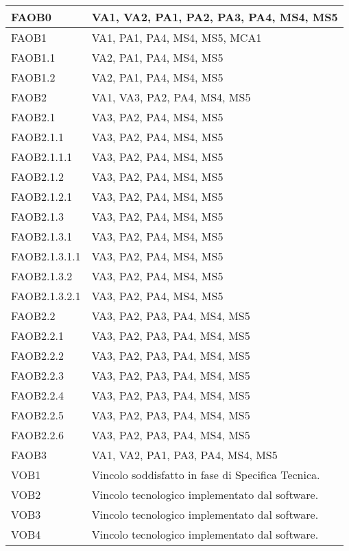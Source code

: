 {{\begin{longtable}{p{} p{}}
\midrule
FAOB0		& 	{VA1, VA2, PA1, PA2, PA3, PA4, MS4, MS5}\\
\midrule
FAOB1		& 	{VA1, PA1, PA4, MS4, MS5, MCA1}\\
\midrule
FAOB1.1		& 	{VA2, PA1, PA4, MS4, MS5}\\
\midrule
FAOB1.2		& 	{VA2, PA1, PA4, MS4, MS5}\\
\midrule
FAOB2		& 	{VA1, VA3, PA2, PA4, MS4, MS5}\\
\midrule
FAOB2.1		& 	{VA3, PA2, PA4, MS4, MS5}\\
\midrule
FAOB2.1.1		& 	{VA3, PA2, PA4, MS4, MS5}\\
\midrule
FAOB2.1.1.1		& 	{VA3, PA2, PA4, MS4, MS5}\\
\midrule
FAOB2.1.2		& 	{VA3, PA2, PA4, MS4, MS5}\\
\midrule
FAOB2.1.2.1		& 	{VA3, PA2, PA4, MS4, MS5}\\
\midrule
FAOB2.1.3		& 	{VA3, PA2, PA4, MS4, MS5}\\
\midrule
FAOB2.1.3.1		& 	{VA3, PA2, PA4, MS4, MS5}\\
\midrule
FAOB2.1.3.1.1		& 	{VA3, PA2, PA4, MS4, MS5}\\
\midrule
FAOB2.1.3.2		& 	{VA3, PA2, PA4, MS4, MS5}\\
\midrule
FAOB2.1.3.2.1		& 	{VA3, PA2, PA4, MS4, MS5}\\
\midrule
FAOB2.2		& 	{VA3, PA2, PA3, PA4, MS4, MS5}\\
\midrule
FAOB2.2.1		& 	{VA3, PA2, PA3, PA4, MS4, MS5}\\
\midrule
FAOB2.2.2		& 	{VA3, PA2, PA3, PA4, MS4, MS5}\\
\midrule
FAOB2.2.3		& 	{VA3, PA2, PA3, PA4, MS4, MS5}\\
\midrule
FAOB2.2.4		& 	{VA3, PA2, PA3, PA4, MS4, MS5}\\
\midrule
FAOB2.2.5		& 	{VA3, PA2, PA3, PA4, MS4, MS5}\\
\midrule
FAOB2.2.6		& 	{VA3, PA2, PA3, PA4, MS4, MS5}\\
\midrule
FAOB3		& 	{VA1, VA2, PA1, PA3, PA4, MS4, MS5}\\
\midrule
VOB1		& 	{Vincolo soddisfatto in fase di Specifica Tecnica.}\\
\midrule
VOB2		& 	{Vincolo tecnologico implementato dal software.}\\
\midrule
VOB3		& 	{Vincolo tecnologico implementato dal software.}\\
\midrule
VOB4		& 	{Vincolo tecnologico implementato dal software.}\\
\midrule

\end{longtable}}}
